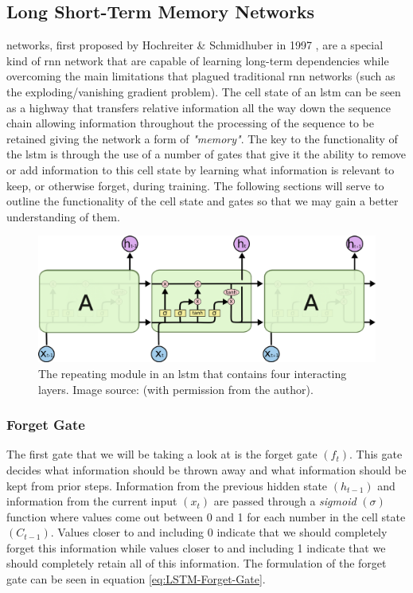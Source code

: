 \subsection{Long Short-Term Memory Networks}
\label{subsec:Background-Information:Forecasting-Models:Long-Short-Term-Memory-Networks}
 networks, first proposed by Hochreiter \& Schmidhuber in 1997 \cite{Hochreiter}, are a special kind of \gls{rnn} network that are capable of learning long-term dependencies while overcoming the main limitations that plagued traditional \gls{rnn} networks (such as the exploding/vanishing gradient problem). The cell state of an \gls{lstm} can be seen as a highway that transfers relative information all the way down the sequence chain allowing information throughout the processing of the sequence to be retained giving the network a form of \textit{"memory"}. The key to the functionality of the \gls{lstm} is through the use of a number of gates that give it the ability to remove or add information to this cell state by learning what information is relevant to keep, or otherwise forget, during training. The following sections will serve to outline the functionality of the cell state and gates so that we may gain a better understanding of them.

\begin{figure}[hbt!]
    \centering
    \includegraphics[width=\textwidth]{Images/Chapter 3/LSTM/LSTM-Chain-Illustration.pdf}
    \caption{The repeating module in an \gls{lstm} that contains four interacting layers. Image source: \cite{Colah}  (with permission from the author).}
    \label{fig:LSTM-Chain-Illustration}
\end{figure}

\subsubsection{Forget Gate}
\label{subsubsec:Background-Information:Forecasting-Models:Long-Short-Term-Memory-Networks:Forget-Gate}
The first gate that we will be taking a look at is the forget gate $(f_t)$. This gate decides what information should be thrown away and what information should be kept from prior steps. Information from the previous hidden state $(h_{t-1})$ and information from the current input $(x_t)$ are passed through a \textit{sigmoid} $(\sigma)$ function where values come out between 0 and 1 for each number in the cell state $(C_{t-1})$. Values closer to and including 0 indicate that we should completely forget this information while values closer to and including 1 indicate that we should completely retain all of this information. The formulation of the forget gate can be seen in equation \ref{eq:LSTM-Forget-Gate}.

